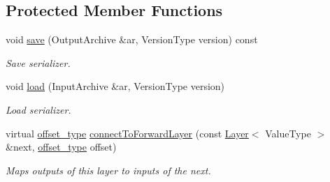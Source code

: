 \subsection*{Protected Member Functions}
\begin{DoxyCompactItemize}
\item 
void \hyperlink{classffnn_1_1layer_1_1_hidden_a1ef2b7dc49a809498125190628e672cf}{save} (Output\-Archive \&ar, Version\-Type version) const 
\begin{DoxyCompactList}\small\item\em Save serializer. \end{DoxyCompactList}\item 
void \hyperlink{classffnn_1_1layer_1_1_hidden_a94cba25f361e7077a3b7eb863d7d2f02}{load} (Input\-Archive \&ar, Version\-Type version)
\begin{DoxyCompactList}\small\item\em Load serializer. \end{DoxyCompactList}\item 
virtual \hyperlink{namespaceffnn_add5752d74b38c6e9b200f3d696fc3ec8}{offset\-\_\-type} \hyperlink{classffnn_1_1layer_1_1_hidden_a850146834d054166b69309d093c650dd}{connect\-To\-Forward\-Layer} (const \hyperlink{classffnn_1_1layer_1_1_layer}{Layer}$<$ Value\-Type $>$ \&next, \hyperlink{namespaceffnn_add5752d74b38c6e9b200f3d696fc3ec8}{offset\-\_\-type} offset)
\begin{DoxyCompactList}\small\item\em Maps outputs of this layer to inputs of the next. \end{DoxyCompactList}\end{DoxyCompactItemize}
